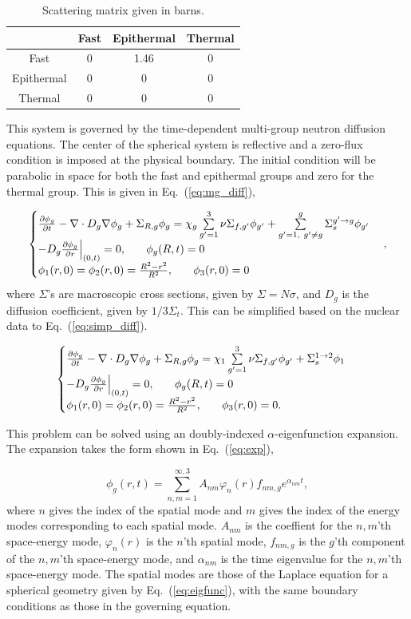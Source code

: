 \documentclass[12pt]{article}
\newcommand{\dxdy}[2]{\frac{\partial #1}{\partial #2}}
\newcommand{\be}{\begin{equation}}
\newcommand{\ee}{\end{equation}}
\newcommand{\pev}{\hspace{0.25in}}
\newcommand{\LEQ}[1]{\label{eq:#1}}
\newcommand{\EQ}[1]{Eq.~(\ref{eq:#1})}
\newcommand{\LTA}[1]{\label{ta:#1}}
\newcommand{\bt}{\begin{table}}
\newcommand{\et}{\end{table}}
\newcommand{\btb}{\begin{center}\begin{tabular}}
\newcommand{\etb}{\end{tabular}\end{center}}
\begin{document}
\bt[h] \centering 
	\caption{Scattering matrix given in barns.} 
	\btb{|c|c|c|c|}
		\hline
		\diagbox{From}{To}& Fast  & Epithermal  & Thermal  \\  \hline
		Fast  & 0 & 1.46 & 0 \\  \hline
		Epithermal & 0 & 0 & 0 \\  \hline
		Thermal  & 0 & 0 & 0 \\  \hline
	\etb \LTA{scat}
\et

This system is governed by the time-dependent multi-group neutron diffusion 
	equations. 
The center of the spherical system is reflective and a zero-flux condition is 
	imposed at the physical boundary. 
The initial condition will be parabolic in space for both the fast and 
	epithermal groups and zero for the thermal group. 
This is given in \EQ{mg_diff},

\be
	\begin{cases}
		\dxdy{\phi_g}{t} - \nabla \cdot D_g \nabla \phi_g + \Sigma_{R,g} \phi_g 
			= \chi_g \sum\limits_{g'=1}^{3} \nu\Sigma_{f,g'} \phi_{g'} + 
		 	\sum\limits_{g'=1, \ g' \neq g}^g \Sigma_s^{g' \rightarrow g} \phi_{g'} \\
		-D_g \dxdy{\phi_g}{r} \Big\rvert_{(0,t)} = 0, \pev \phi_g(R,t) = 0 \\
			\phi_1(r,0) = \phi_2(r,0) = \frac{R^2 - r^2}{R^2}, \pev \phi_3(r,0) = 0
	\end{cases} ,
	\LEQ{mg_diff}
\ee 
where $\Sigma$'s are macroscopic cross sections, given by $\Sigma = N\sigma$, 
	and $D_g$ is the diffusion coefficient, given by $1/3\Sigma_t$. 
This can be simplified based on the nuclear data to \EQ{simp_diff}.

\be
	\begin{cases}
		\dxdy{\phi_g}{t} - \nabla \cdot D_g \nabla \phi_g + \Sigma_{R,g} \phi_g 
			= \chi_1 \sum\limits_{g'=1}^{3} \nu\Sigma_{f,g'} \phi_{g'} + 
			\Sigma_s^{1 \rightarrow 2} \phi_{1} \\
		-D_g \dxdy{\phi_g}{r} \Big\rvert_{(0,t)} = 0, \pev \phi_g(R,t) = 0 \\
		\phi_1(r,0) = \phi_2(r,0) = \frac{R^2 - r^2}{R^2}, \pev \phi_3(r,0) = 0.
	\end{cases} 
	\LEQ{simp_diff}
\ee

This problem can be solved using an doubly-indexed $\alpha$-eigenfunction 
	expansion.  
The expansion takes the form shown in \EQ{exp},

\be
	\phi_g(r, t) = \sum_{n, m = 1}^{\infty, 3} A_{nm} \varphi_n(r) f_{nm, g} e^{\alpha_{nm} t},
\LEQ{exp} \ee
where $n$ gives the index of the spatial mode and $m$ gives the index of the 
	energy modes corresponding to each spatial mode.
$A_{nm}$ is the coeffient for the $n,m$'th space-energy mode, $\varphi_n(r)$ is 
	the $n$'th spatial mode, $f_{nm, g}$ is the $g$'th component of the $n,m$'th 
	space-energy mode, and $\alpha_{nm}$ is the time eigenvalue for the $n,m$'th 
	space-energy mode. 
The spatial modes are those of the Laplace equation for a spherical geometry 
	given by \EQ{eigfunc}, with the same boundary conditions as those in the 
	governing equation.
\end{document}
